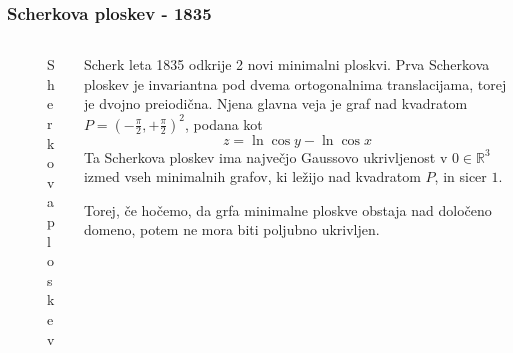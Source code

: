 \documentclass[8pt]{beamer}
\newcommand{\samplescalar}{50} %
\theoremstyle{definition}
\theoremstyle{remark}
\theoremstyle{plain}
\numberwithin{equation}{section}  %
\begin{document}
\begin{frame}
    \frametitle{Scherkova ploskev - 1835}

    \begin{columns}
        \begin{column}{0.24\textwidth}
            \centering
            \begin{figure}[H]
                \centering
                \caption{Sherkova ploskev}
            \end{figure}
        \end{column}

        \begin{column}{0.76\textwidth}
            Scherk leta 1835 odkrije 2 novi minimalni ploskvi. Prva Scherkova ploskev je invariantna pod dvema ortogonalnima translacijama, torej je dvojno preiodična. Njena glavna veja je graf nad kvadratom $P=\left(-\frac{\pi}{2}, +\frac{\pi}{2}\right)^2$, podana kot
            \begin{equation*}
                z = \ln{\cos{y}} - \ln{\cos{x}}
            \end{equation*}
            Ta Scherkova ploskev ima največjo Gaussovo ukrivljenost v $0\in \mathbb{R}^3$ izmed vseh minimalnih grafov, ki ležijo nad kvadratom $P$, in sicer $1$. 

            \vspace{0.8em}

            \textcolor{red1}{Torej, če hočemo, da grfa minimalne ploskve obstaja nad določeno domeno, potem ne mora biti poljubno ukrivljen.} 
            \begin{figure}[H]
                \center
\end{figure}
\end{column}
\end{columns}
\end{frame}
\end{document}
